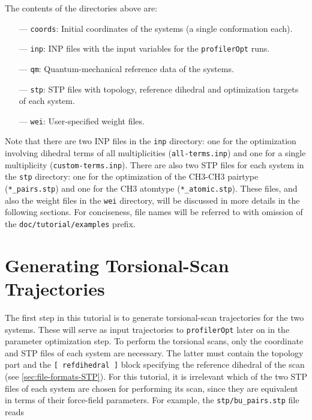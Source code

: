 \documentclass[10pt,a4paper,openany]{memoir}
\numberwithin{equation}{section}
\newcommand{\under}{\_}
\newcommand{\profileropt}[0]{\texttt{profilerOpt}}
\begin{document}
\noindent The contents of the directories above are:
\begin{itemize}
\item [---] \texttt{coords}: Initial coordinates of the systems (a single conformation each).
\item [---] \texttt{inp}: INP files with the input variables for the \profileropt{} runs. 
\item [---] \texttt{qm}: Quantum-mechanical reference data of the systems.
\item [---] \texttt{stp}: STP files with topology, reference dihedral and optimization targets of each system.
\item [---] \texttt{wei}: User-specified weight files.
\end{itemize}
%
Note that there are two INP files in the \texttt{inp} directory: one
for the optimization involving dihedral terms of all multiplicities
(\texttt{all-terms.inp}) and one for a single multiplicity
(\texttt{custom-terms.inp}).
%
There are also two STP files for each system in the \texttt{stp}
directory: one for the optimization of the CH3-CH3 pairtype
(\texttt{*\under{}pairs.stp}) and one for the CH3 atomtype
(\texttt{*\under{}atomic.stp}).
%
These files, and also the weight files in the \texttt{wei} directory,
will be discussed in more details in the following sections.
%
For conciseness, file names will be referred to with omission
of the \texttt{doc/tutorial/examples} prefix.

\section{Generating Torsional-Scan Trajectories}
\label{sec:tutorial-profilergen}

The first step in this tutorial is to generate torsional-scan
trajectories for the two systems.
%
These will serve as input trajectories to \profileropt{} later on in
the parameter optimization step.
%
To perform the torsional scans, only the coordinate and
STP files of each system are necessary.
%
The latter must contain the topology part and the
\texttt{[~refdihedral~]} block specifying the reference dihedral of
the scan (see \autoref{sec:file-formats-STP}).
%
For this tutorial, it is irrelevant which of the two STP files of each
system are chosen for performing its scan, since they are equivalent
in terms of their force-field parameters.
%
%
For example, the \texttt{stp/bu\under{}pairs.stp} file reads
\end{document}
